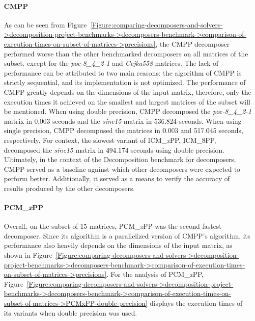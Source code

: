 \paragraph{CMPP} As can be seen from Figure~\ref{Figure:comparing-decomposers-and-solvers->decomposition-project-benchmarks->decomposers-benchmark->comparison-of-execution-times-on-subset-of-matrices->precisions}, the CMPP decomposer performed worse than the other benchmarked decomposers on all matrices of the subset, except for the \textit{poc-8\_4\_2-1} and \textit{Cejka558} matrices. The lack of performance can be attributed to two main reasons: the algorithm of CMPP is strictly sequential, and its implementation is not optimized. The performance of CMPP greatly depends on the dimensions of the input matrix, therefore, only the execution times it achieved on the smallest and largest matrices of the subset will be mentioned. When using double precision, CMPP decomposed the \textit{poc-8\_4\_2-1} matrix in 0.003 seconds and the \textit{sinc15} matrix in 536.824 seconds. When using single precision, CMPP decomposed the matrices in 0.003 and 517.045 seconds, respectively. For context, the slowest variant of ICM\_\textit{x}PP, ICM\_8PP, decomposed the \textit{sinc15} matrix in 494.174 seconds using double precision. Ultimately, in the context of the Decomposition benchmark for decomposers, CMPP served as a baseline against which other decomposers were expected to perform better. Additionally, it served as a means to verify the accuracy of results produced by the other decomposers.

\paragraph{PCM\_\textit{x}PP}\label{Paragraph:comparing-decomposers-and-solvers->decomposition-project-benchmarks->decomposers-benchmark->comparison-of-execution-times-on-subset-of-matrices->PCMxPP} Overall, on the subset of 15 matrices, PCM\_\textit{x}PP was the second fastest decomposer. Since its algorithm is a parallelized version of CMPP's algorithm, its performance also heavily depends on the dimensions of the input matrix, as shown in Figure~\ref{Figure:comparing-decomposers-and-solvers->decomposition-project-benchmarks->decomposers-benchmark->comparison-of-execution-times-on-subset-of-matrices->precisions}. For the analysis of PCM\_\textit{x}PP, Figure~\ref{Figure:comparing-decomposers-and-solvers->decomposition-project-benchmarks->decomposers-benchmark->comparison-of-execution-times-on-subset-of-matrices->PCMxPP-double-precision} displays the execution times of its variants when double precision was used.

